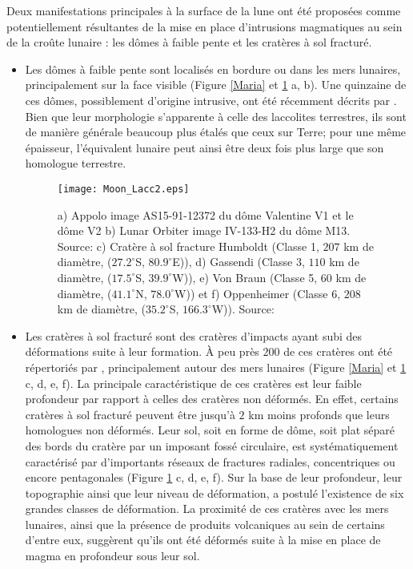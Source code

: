 Deux manifestations principales à la surface de la lune ont été
proposées comme potentiellement résultantes de la mise en place
d'intrusions magmatiques au sein de la croûte lunaire : les dômes à
faible pente et les cratères à sol fracturé.

\begin{itemize}
\item Les dômes à faible pente sont localisés en bordure ou dans les
 mers lunaires, principalement sur la face visible (Figure
 \ref{Maria} et \ref{C1-Moon-magma} a, b). Une quinzaine de ces
 dômes, possiblement d'origine intrusive, ont été récemment décrits
 par \citet{Wohler:2007it}. Bien que leur morphologie s'apparente à
 celle des laccolites terrestres, ils sont de manière générale beaucoup
 plus étalés que ceux sur Terre; pour une même épaisseur,
 l'équivalent lunaire peut ainsi être deux fois plus large que son
 homologue terrestre.

 \begin{figure}[htpb]
 \begin{center}
 \graphicspath{ {/Users/thorey/Documents/These/Manuscript/Figure/Chapter1/} }
 \texttt{[image: Moon\_Lacc2.eps]}
 \caption{a) Appolo image AS15-91-12372 du dôme Valentine V1 et
 le dôme V2 b) Lunar Orbiter image IV-133-H2 du dôme
 M13. Source: \citet{Wohler:2009jj} c) Cratère à sol fracture
 Humboldt (Classe 1, $207$ km de diamètre, ($27.2^\circ$S,
 $80.9^\circ$E)), d) Gassendi (Classe 3, $110$ km de diamètre,
 ($17.5^\circ$S, $39.9^\circ$W)), e) Von Braun (Classe 5, $60$
 km de diamètre, ($41.1^\circ$N, $78.0^\circ$W)) et f)
 Oppenheimer (Classe 6, $208$ km de diamètre, ($35.2^\circ$S,
 $166.3^\circ$W)). Source: \citet{Jozwiak:2015iy}}
 \label{C1-Moon-magma}
 \end{center}
 \end{figure}

\item Les  cratères à sol  fracturé sont des cratères  d'impacts ayant
  subi des déformations  suite à leur formation. À peu  près $ 200$ de
  ces  cratères   ont  été  répertoriés   par  \citet{Schultz:1976kt},
  principalement  autour  des  mers lunaires  (Figure  \ref{Maria}  et
  \ref{C1-Moon-magma} c,  d, e,  f). La principale  caractéristique de
  ces cratères  est leur  faible profondeur par  rapport à  celles des
  cratères non  déformés. En effet,  certains cratères à  sol fracturé
  peuvent être jusqu'à $2$ km  moins profonds que leurs homologues non
  déformés. Leur  sol, soit  en forme  de dôme,  soit plat  séparé des
  bords   du   cratère  par   un   imposant   fossé  circulaire,   est
  systématiquement caractérisé  par d'importants réseaux  de fractures
  radiales,    concentriques    ou   encore    pentagonales    (Figure
  \ref{C1-Moon-magma} c,  d, e,  f). Sur la  base de  leur profondeur,
  leur   topographie   ainsi   que   leur   niveau   de   déformation,
  \citet{Schultz:1976kt} a postulé l'existence  de six grandes classes
  de déformation. La proximité de ces cratères avec les mers lunaires,
  ainsi que  la présence de  produits volcaniques au sein  de certains
  d'entre eux,  suggèrent qu'ils  ont été  déformés suite  à la  mise en
  place de magma en profondeur sous leur sol.
\end{itemize}

